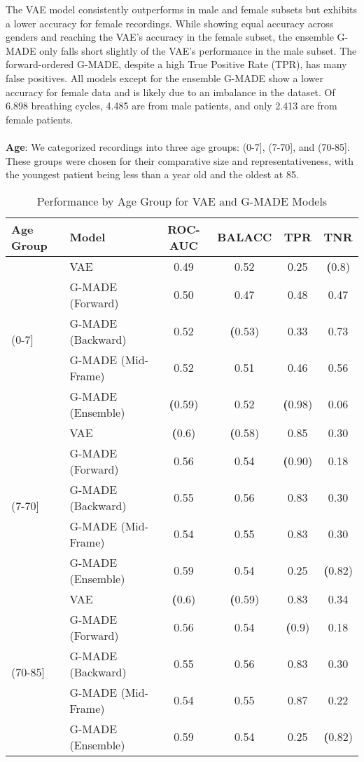 The VAE model consistently outperforms in male and female subsets but exhibits a lower accuracy for female recordings. While showing equal accuracy across genders and reaching the VAE's accuracy in the female subset, the ensemble G-MADE only falls short slightly of the VAE's performance in the male subset. The forward-ordered G-MADE, despite a high True Positive Rate (TPR), has many false positives. All models except for the ensemble G-MADE show a lower accuracy for female data and is likely due to an imbalance in the dataset. Of 6.898 breathing cycles, 4.485 are from male patients, and only 2.413 are from female patients.\\\\
\textbf{Age}: We categorized recordings into three age groups: (0-7], (7-70], and (70-85]. These groups were chosen for their comparative size and representativeness, with the youngest patient being less than a year old and the oldest at 85.

\begin{table}[h!]
    \centering
    \caption{Performance by Age Group for VAE and G-MADE Models}
    \begin{tabular}{|l|l|c|c|c|c|}
    \hline
    \textbf{Age Group} & \textbf{Model} & \textbf{ROC-AUC} & \textbf{BALACC} & \textbf{TPR} & \textbf{TNR} \\
    \hline
    \multirow{5}{*}{(0-7]} 
    & VAE & 0.49 & 0.52 & 0.25 & \textbf(0.8) \\
    & G-MADE (Forward) & 0.50 & 0.47 & 0.48 & 0.47 \\
    & G-MADE (Backward) & 0.52 & \textbf(0.53) & 0.33 & 0.73 \\
    & G-MADE (Mid-Frame) & 0.52 & 0.51 & 0.46 & 0.56 \\
    & G-MADE (Ensemble) & \textbf(0.59) & 0.52 & \textbf(0.98) & 0.06 \\
    \hline
    \multirow{5}{*}{(7-70]} 
    & VAE & \textbf(0.6) & \textbf(0.58) & 0.85 & 0.30 \\
    & G-MADE (Forward) & 0.56 & 0.54 & \textbf(0.90) & 0.18 \\
    & G-MADE (Backward) & 0.55 & 0.56 & 0.83 & 0.30 \\
    & G-MADE (Mid-Frame) & 0.54 & 0.55 & 0.83 & 0.30 \\
    & G-MADE (Ensemble) & 0.59 & 0.54 & 0.25 & \textbf(0.82) \\
    \hline
    \multirow{5}{*}{(70-85]} 
    & VAE & \textbf(0.6) & \textbf(0.59) & 0.83 & 0.34 \\
    & G-MADE (Forward) & 0.56 & 0.54 & \textbf(0.9) & 0.18 \\
    & G-MADE (Backward) & 0.55 & 0.56 & 0.83 & 0.30 \\
    & G-MADE (Mid-Frame) & 0.54 & 0.55 & 0.87 & 0.22 \\
    & G-MADE (Ensemble) & 0.59 & 0.54 & 0.25 & \textbf(0.82) \\
    \hline
    \end{tabular}
\end{table}

